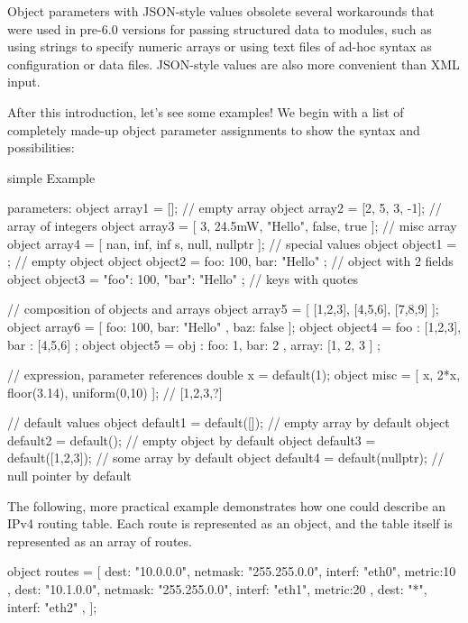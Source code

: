 Object parameters with JSON-style values obsolete several workarounds that were
used in pre-6.0 {\opp} versions for passing structured data to modules, such as
using strings to specify numeric arrays or using text files of ad-hoc syntax as
configuration or data files. JSON-style values are also more convenient than XML
input.

After this introduction, let's see some examples! We begin with a list of
completely made-up object parameter assignments to show the syntax and
possibilities:

\begin{ned}
simple Example {
    parameters:
        object array1 = []; // empty array
        object array2 = [2, 5, 3, -1]; // array of integers
        object array3 = [ 3, 24.5mW, "Hello", false, true ]; // misc array
        object array4 = [ nan, inf, inf s, null, nullptr ]; // special values
        object object1 = {};  // empty object
        object object2 = { foo: 100, bar: "Hello" }; // object with 2 fields
        object object3 = { "foo": 100, "bar": "Hello" }; // keys with quotes

        // composition of objects and arrays
        object array5 = [ [1,2,3], [4,5,6], [7,8,9] ];
        object array6 = [ { foo: 100, bar: "Hello" }, { baz: false } ];
        object object4 = { foo : [1,2,3], bar : [4,5,6] };
        object object5 = { obj : { foo: 1, bar: 2 }, array: [1, 2, 3 ] };

        // expression, parameter references
        double x = default(1);
        object misc = [ x, 2*x, floor(3.14), uniform(0,10) ]; // [1,2,3,?]

        // default values
        object default1 = default([]); // empty array by default
        object default2 = default({}); // empty object by default
        object default3 = default([1,2,3]); // some array by default
        object default4 = default(nullptr); // null pointer by default
}
\end{ned}

The following, more practical example demonstrates how one could describe an
IPv4 routing table. Each route is represented as an object, and the table itself
is represented as an array of routes.

\begin{ned}
object routes = [
    { dest: "10.0.0.0", netmask: "255.255.0.0", interf: "eth0", metric:10 },
    { dest: "10.1.0.0", netmask: "255.255.0.0", interf: "eth1", metric:20 },
    { dest: "*", interf: "eth2" },
];
\end{ned}

